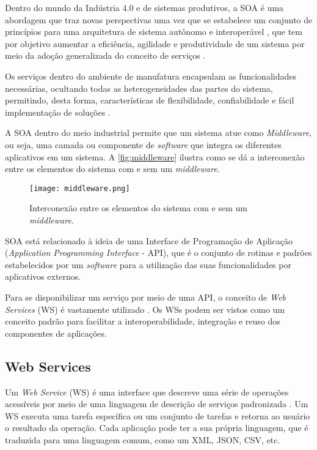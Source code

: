 	Dentro do mundo da Indústria 4.0 e de sistemas produtivos, a SOA é uma abordagem que traz novas perspectivas uma vez que se estabelece um conjunto de princípios para uma arquitetura de sistema autônomo e interoperável \cite{candido2009soa}, que tem por objetivo aumentar a eficiência, agilidade e produtividade de um sistema por meio da adoção generalizada do conceito de serviços \cite{souit2013soa}.
	
	Os serviços dentro do ambiente de manufatura encapsulam as funcionalidades necessárias, ocultando todas as heterogeneidades das partes do sistema, permitindo, desta forma, características de flexibilidade, confiabilidade e fácil implementação de	soluções \cite{groba2008soa}.
	
	A SOA dentro do meio industrial permite que um sistema atue como \textit{Middleware}, ou seja, uma camada ou componente de \textit{software} que integra os diferentes aplicativos em um sistema. A \autoref{fig:middleware} ilustra como se dá a interconexão entre os elementos do sistema com e sem um \textit{middleware}.
	
	\begin{figure}[htb]
		\centering
		\caption{Interconexão entre os elementos do sistema com e sem um \textit{middleware}.}
		\label{fig:middleware}
		\texttt{[image: middleware.png]}
	\end{figure}

	SOA está relacionado à ideia de uma Interface de Programação de Aplicação (\textit{Application Programming Interface} - API), que é o conjunto de rotinas e padrões estabelecidos por um \textit{software} para a utilização das suas funcionalidades por aplicativos externos.
	
	Para se disponibilizar um serviço por meio de uma API, o conceito de \textit{Web Services} (WS) é vastamente utilizado \cite{souit2013soa}. Os WSs podem ser vistos como um conceito padrão para facilitar a interoperabilidade, integração e reuso dos componentes de aplicações.
	
	\subsection{Web Services}
	
	Um \textit{Web Service} (WS) é uma interface que descreve uma série de operações acessíveis por meio de uma linguagem de descrição de serviços padronizada \cite{gottschalk2002webservices}. Um WS executa uma tarefa específica ou um conjunto de tarefas e retorna ao usuário o resultado da operação. Cada aplicação pode ter a sua própria linguagem, que é traduzida para uma linguagem comum, como um XML, JSON, CSV, etc.
	
